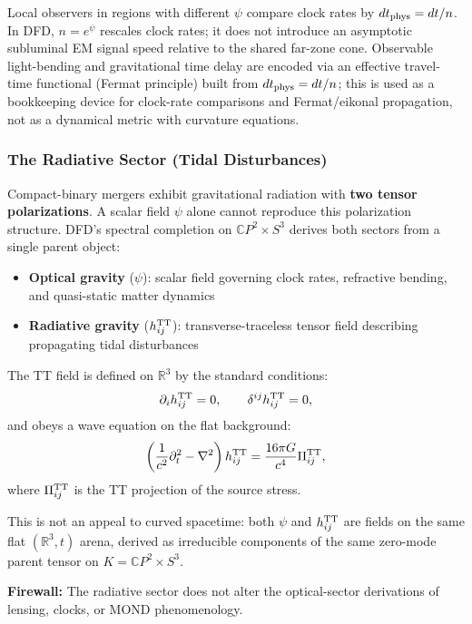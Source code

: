 Local observers in regions with different $\psi$ compare clock rates by $dt_{\rm phys} = dt/n$. In DFD, $n = e^\psi$ rescales clock rates; it does not introduce an asymptotic subluminal EM signal speed relative to the shared far-zone cone. Observable light-bending and gravitational time delay are encoded via an effective travel-time functional (Fermat principle) built from $dt_{\rm phys} = dt/n$; this is used as a bookkeeping device for clock-rate comparisons and Fermat/eikonal propagation, not as a dynamical metric with curvature equations.

\subsubsection{The Radiative Sector (Tidal Disturbances)}

Compact-binary mergers exhibit gravitational radiation with \textbf{two tensor polarizations}. A scalar field $\psi$ alone cannot reproduce this polarization structure. DFD's spectral completion on $\mathbb{C}P^2 \times S^3$ derives both sectors from a single parent object:
\begin{itemize}
\item \textbf{Optical gravity} ($\psi$): scalar field governing clock rates, refractive bending, and quasi-static matter dynamics
\item \textbf{Radiative gravity} ($h_{ij}^{\rm TT}$): transverse-traceless tensor field describing propagating tidal disturbances
\end{itemize}

The TT field is defined on $\mathbb{R}^3$ by the standard conditions:
\begin{equation}
\partial_i h_{ij}^{\rm TT} = 0, \qquad \delta^{ij}h_{ij}^{\rm TT} = 0,
\end{equation}
and obeys a wave equation on the flat background:
\begin{equation}\label{eq:TT-wave-eq}
\left(\frac{1}{c^2}\partial_t^2 - \nabla^2\right)h_{ij}^{\rm TT} = \frac{16\pi G}{c^4}\Pi_{ij}^{\rm TT},
\end{equation}
where $\Pi_{ij}^{\rm TT}$ is the TT projection of the source stress.

This is not an appeal to curved spacetime: both $\psi$ and $h_{ij}^{\rm TT}$ are fields on the same flat $(\mathbb{R}^3, t)$ arena, derived as irreducible components of the same zero-mode parent tensor on $K = \mathbb{C}P^2 \times S^3$.

\textbf{Firewall:} The radiative sector does not alter the optical-sector derivations of lensing, clocks, or MOND phenomenology.

